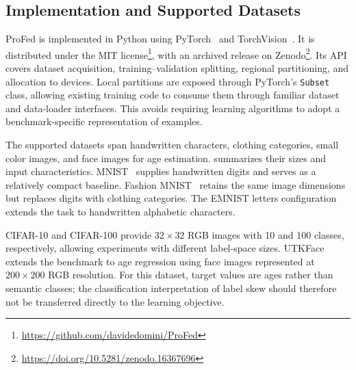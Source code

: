 \subsection{Implementation and Supported Datasets}
\label{sec:profed-implementation}

ProFed is implemented in Python using
 PyTorch~\cite{DBLP:conf/asplos/AnselYHGJVBBBBC24} and
 TorchVision~\cite{TorchVision}.
%
It is distributed under the MIT
 license\footnote{\url{https://github.com/davidedomini/ProFed}},
 with an archived release on
 Zenodo\footnote{\url{https://doi.org/10.5281/zenodo.16367696}}.
%
Its API covers dataset acquisition, training--validation splitting,
 regional partitioning, and allocation to devices.
%
Local partitions are exposed through PyTorch's \texttt{Subset} class,
 allowing existing training code to consume them through familiar dataset
 and data-loader interfaces.
%
This avoids requiring learning algorithms to adopt a benchmark-specific
 representation of examples.

The supported datasets span handwritten characters, clothing categories,
 small color images, and face images for age estimation.
%
 summarizes their sizes and input characteristics.
%
MNIST~\cite{lecun2010mnist} supplies handwritten digits and serves as a
 relatively compact baseline.
%
Fashion MNIST~\cite{DBLP:journals/corr/abs-1708-07747} retains the same image
 dimensions but replaces digits with clothing categories.
%
The EMNIST letters configuration~\cite{DBLP:journals/corr/CohenATS17}
 extends the task to handwritten alphabetic characters.

CIFAR-10 and CIFAR-100 provide $32\times32$ RGB images with 10 and 100
 classes, respectively, allowing experiments with different label-space sizes.
%
UTKFace~\cite{DBLP:conf/cvpr/ZhangSQ17} extends the benchmark to age
 regression using face images represented at $200\times200$ RGB resolution.
%
For this dataset, target values are ages rather than semantic classes;
 the classification interpretation of label skew should therefore not be
 transferred directly to the learning objective.

